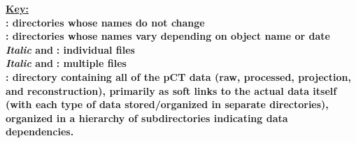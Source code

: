 \documentclass[landscape,12pt]{article}
\begin{document}
\baylorsection
\noindent\ul{\textbf{Key:}}\\
\vspace{0.3cm}
\color{Black}\textbf{ : directories whose names do not change}\\
\color{Black}\textbf{ : directories whose names vary depending on object name or date}\\
\color{Black}\textbf{\textit{Italic} and \color{DodgerBlue3}{Royal Blue}\color{Black}}\textbf{ : individual files}\\
\color{Black}\textbf{\textit{Italic} and \color{DarkBlue}{Dark Blue}\color{Black}}\textbf{ : multiple files }\\
\baylorsection
\textbf{ \color{Black}: directory containing all of the pCT data (raw, processed, projection, and reconstruction), primarily as soft links to the actual data itself (with each type of data stored/organized in separate directories), organized in a hierarchy of subdirectories indicating data dependencies.}
\end{document}
